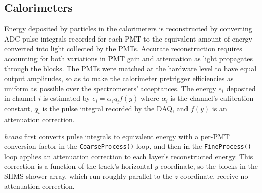 \subsection{Calorimeters}


%

Energy deposited by particles in the calorimeters is reconstructed by
converting ADC pulse integrals recorded for each PMT to
the equivalent amount of energy converted into light collected by the PMTs.
Accurate reconstruction requires accounting for both
variations in PMT gain
and
attenuation as light propagates through the blocks.
The PMTs were matched at the hardware level to have equal output amplitudes, so
as to make the calorimeter pretrigger efficiencies as uniform as possible over
the spectrometers' acceptances.
The energy $e_i$ deposited in channel $i$ is estimated by
$e_i = \alpha_i q_i f(y)$
where
$\alpha_i$ is the channel's calibration constant,
$q_i$ is the pulse integral recorded by the DAQ,
and $f(y)$ is an attenuation correction.

\textit{hcana} first converts pulse integrals to equivalent energy with a
per-PMT conversion factor in the \texttt{CoarseProcess()} loop, and then
in the \texttt{FineProcess()} loop applies an attenuation correction
to each layer's reconstructed energy.
This correction is a function of the track's horizontal $y$ coordinate, so the
blocks in the SHMS shower array, which run roughly parallel to the $z$
coordinate, receive no attenuation correction.

